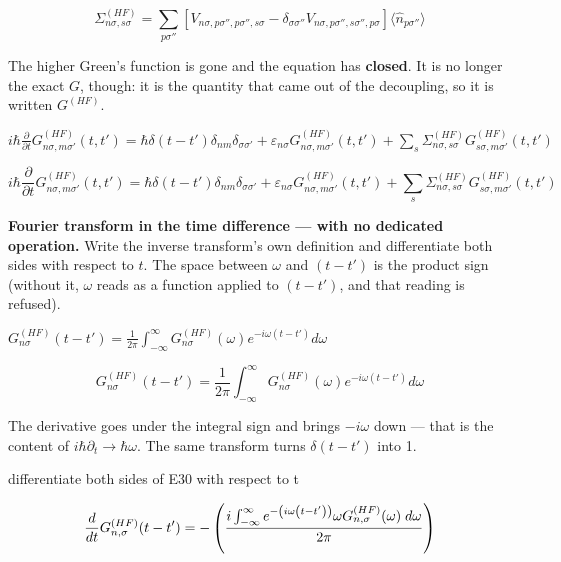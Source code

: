 \documentclass[dvipdfmx]{article}
\begin{document}
\begin{equation}
  \Sigma^{(HF)}_{n\sigma,s\sigma} = \sum_{p \sigma''}\left[V_{n\sigma,p\sigma'',p\sigma'',s\sigma} - \delta_{\sigma\sigma''}V_{n\sigma,p\sigma'',s\sigma'',p\sigma}\right]\langle \hat n_{p\sigma''} \rangle
  \label{eq:E28}
\end{equation}

The higher Green's function is gone and the equation has \textbf{closed}. It is no longer the exact $G$, though: it is the quantity that came out of the decoupling, so it is written $G^{(HF)}$.

$i\hbar \frac{\partial}{\partial t} G^{(HF)}_{n\sigma,m\sigma'}(t,t') = \hbar\delta(t-t')\delta_{nm}\delta_{\sigma\sigma'} + \varepsilon_{n\sigma} G^{(HF)}_{n\sigma,m\sigma'}(t,t') + \sum_{s} \Sigma^{(HF)}_{n\sigma,s\sigma} G^{(HF)}_{s\sigma,m\sigma'}(t,t')$

\begin{equation}
  i\hbar \frac{\partial}{\partial t} G^{(HF)}_{n\sigma,m\sigma'}(t,t') = \hbar\delta(t-t')\delta_{nm}\delta_{\sigma\sigma'} + \varepsilon_{n\sigma} G^{(HF)}_{n\sigma,m\sigma'}(t,t') + \sum_{s} \Sigma^{(HF)}_{n\sigma,s\sigma} G^{(HF)}_{s\sigma,m\sigma'}(t,t')
  \label{eq:E29}
\end{equation}

\textbf{Fourier transform in the time difference — with no dedicated operation.} Write the inverse transform's own definition and differentiate both sides with respect to $t$. The space between $\omega$ and $(t-t')$ is the product sign (without it, $\omega$ reads as a function applied to $(t-t')$, and that reading is refused).

$G^{(HF)}_{n\sigma}(t-t') = \frac{1}{2\pi}\int_{-\infty}^{\infty} G^{(HF)}_{n\sigma}(\omega) e^{-i\omega (t-t')} d\omega$

\begin{equation}
  G^{(HF)}_{n\sigma}(t-t') = \frac{1}{2\pi}\int_{-\infty}^{\infty} G^{(HF)}_{n\sigma}(\omega) e^{-i\omega (t-t')} d\omega
  \label{eq:E30}
\end{equation}

The derivative goes under the integral sign and brings $-i\omega$ down — that is the content of $i\hbar\partial_t \to \hbar\omega$. The same transform turns $\delta(t-t')$ into 1.

differentiate both sides of E30 with respect to t

\begin{equation}
  \frac{d}{d t} G^{(HF)}_{n,\sigma}(t-t')=-\left({{i \int_{-\infty }^{\infty }{e^ {- \left(i \omega \left(t-t'\right)\right) } \omega G^{(HF)}_{n,\sigma}(\omega)\;d\omega}}\over{2 \pi}}\right)
  \label{eq:E31}
\end{equation}
\end{document}
